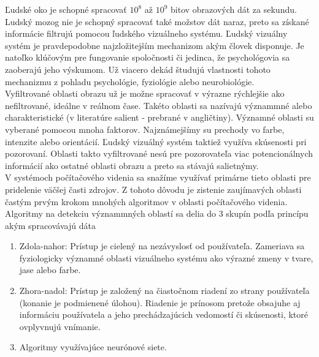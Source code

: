 
Ľudské oko je schopné spracovať \begin{math}10^8\end{math} až \begin{math}10^9\end{math} bitov obrazových dát za sekundu.
Ludský mozog nie je schopný spracovať také možstov dát naraz, preto sa získané informácie filtrujú pomocou ľudského vizuálneho systému\cite{Fmph-videnie}.
Ľudský vizuálny systém je pravdepodobne najzložitejším mechanizom akým človek disponuje.
Je natoľko klúčovým pre fungovanie spoločnosti či jedinca, že psychológovia sa zaoberajú jeho výskumom.
Už viacero dekád študujú vlastnosti tohoto mechanizmu z pohladu psychológie, fyziológie alebo neurobiológie.
\\
Vyfiltrované oblasti obrazu už je možne spracovať v výrazne rýchlejšie ako nefiltrované, ideálne v reálnom čase.
Takéto oblasti sa nazívajú význammné alebo charakteristické (v literatúre salient - prebrané v angličtiny).
Významné oblasti su vyberané pomocou mnoha faktorov.
Najznámejšímy su prechody vo farbe, intenzite alebo orientácií.
Ľudský vizuálný systém taktiež využíva skúsenosti pri pozorovaní.
Oblasti takto vyfiltrované nesú pre pozorovateľa viac potencionálnych informácií ako ostatné oblasti obrazu a preto sa stávajú salietnýmy.
\\
V systémoch počítačového videnia sa snažíme využívať primárne tieto oblasti pre pridelenie väčšej časti zdrojov.
Z tohoto dôvodu je zistenie zaujímavých oblasti častým prvým krokom mnohých algoritmov v oblasti počítačového videnia.
\\
Algoritmy na detekciu význammných oblastí sa delia do 3 skupín podľa princípu akým spracovávajú dáta\cite{brief-survey}

  \begin{enumerate}
          \item Zdola-nahor: Prístup je cielený na nezávyslosť od používateľa.
          Zameriava sa fyziologicky významné oblasti vizuálneho systému ako výrazné zmeny v tvare, jase alebo farbe.
          \item Zhora-nadol: Prístup je založený na čiastočnom riadení zo strany používateľa (konanie je podmienené úlohou).
          Riadenie je prínosom pretože obsajuhe aj informáciu používatela a jeho prechádzajúcich vedomostí či skúsenosti, ktoré ovplyvnujú vnímanie.
          \item Algoritmy využívajúce neurónové siete.
  \end{enumerate}


